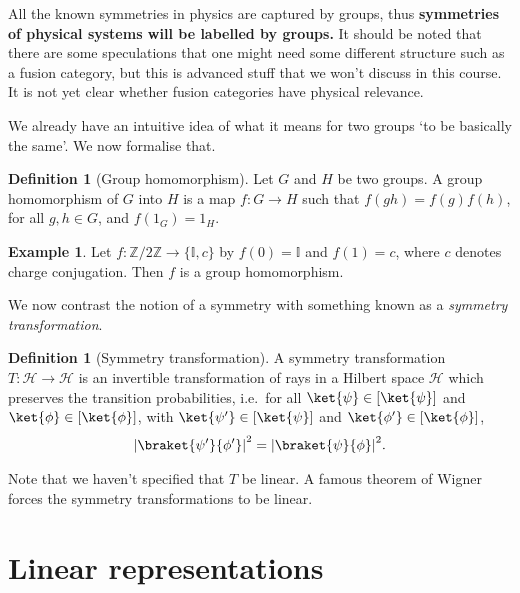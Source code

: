 \documentclass[a4 paper, 12pt, oneside]{book}
\theoremstyle{definition}
\newtheorem{definition}[theorem]{Definition}
\newtheorem{example}[theorem]{Example}
\newcommand{\ii}{\mathbb{I}}
\newcommand{\zz}{\mathbb{Z}}
\DeclarePairedDelimiter{\abs}{\lvert}{\rvert}
\newcommand{\hilbert}{\mathcal{H}}
\begin{document}
	All the known symmetries in physics are captured by groups, thus \textbf{symmetries of physical systems will be labelled by groups.} It should be noted that there are some speculations that one might need some different structure such as a fusion category, but this is advanced stuff that we won't discuss in this course. It is not yet clear whether fusion categories have physical relevance.

	We already have an intuitive idea of what it means for two groups `to be basically the same'. We now formalise that.
	\begin{definition}[Group homomorphism]
		Let \(G\) and \(H\) be two groups. A group homomorphism of \(G\) into \(H\) is a map \(f \colon G \rightarrow H\) such that \(f(gh) = f(g) f(h)\), for all \(g, h \in G\), and \(f(1_G) = 1_H\).
	\end{definition}

	\begin{example}
		Let \(f \colon \zz/2\zz \rightarrow \{\ii, c\}\) by \(f(0) = \ii\) and \(f(1) = c\), where \(c\) denotes charge conjugation. Then \(f\) is a group homomorphism.
	\end{example}

	We now contrast the notion of a symmetry with something known as a \textit{symmetry transformation}.
	\begin{definition}[Symmetry transformation]
		A symmetry transformation \(T \colon \hilbert \rightarrow \hilbert\) is an invertible transformation of rays in a Hilbert space \(\hilbert\) which preserves the transition probabilities, i.e.\ for all \(\ket{\psi} \in [\ket{\psi}]\) and \(\ket{\phi} \in [\ket{\phi}]\), with \(\ket{\psi'} \in [\ket{\psi}]\) and \(\ket{\phi'} \in [\ket{\phi}]\),
		\begin{align*}
			{\abs{\braket{\psi'}{\phi'}}}^2 = {\abs{\braket{\psi}{\phi}}}^2.
		\end{align*}
	\end{definition}
	Note that we haven't specified that \(T\) be linear. A famous theorem of Wigner forces the symmetry transformations to be linear.

	\section{Linear representations}
\end{document}
